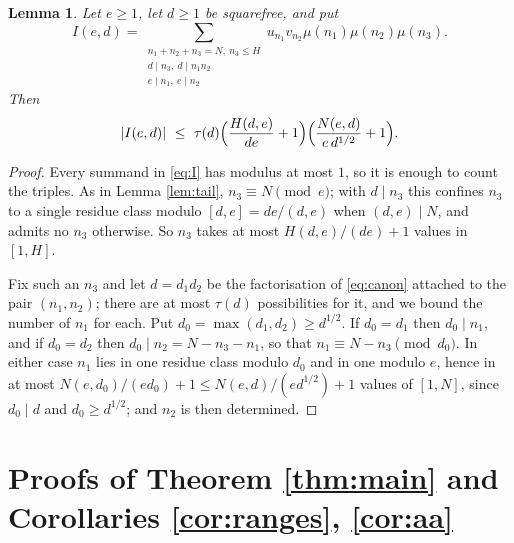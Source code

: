 \documentclass[11pt,a4paper]{article}
\theoremstyle{plain}
\newtheorem{lemma}[theorem]{Lemma}
\theoremstyle{remark}
\newcommand{\lcm}[1]{[#1]}
\begin{document}
\begin{lemma}\label{lem:larged}
Let $e\ge1$, let $d\ge1$ be squarefree, and put
\begin{equation}\label{eq:I}
  I(e,d)=\sum_{\substack{n_1+n_2+n_3=N,\ n_3\le H\\ d\mid n_3,\ d\mid n_1n_2\\ e\mid n_1,\ e\mid n_2}}
  u_{n_1}v_{n_2}\mu(n_1)\mu(n_2)\mu(n_3).
\end{equation}
Then
\[
  |I(e,d)|\ \le\ \tau(d)\Bigl(\frac{H(d,e)}{de}+1\Bigr)\Bigl(\frac{N(e,d)}{e\,d^{1/2}}+1\Bigr).
\]
\end{lemma}

\begin{proof}
Every summand in \eqref{eq:I} has modulus at most $1$, so it is enough to count the triples.
As in Lemma \ref{lem:tail}, $n_3\equiv N\pmod e$; with $d\mid n_3$ this confines $n_3$ to a single
residue class modulo $\lcm{d,e}=de/(d,e)$ when $(d,e)\mid N$, and admits no $n_3$ otherwise. So $n_3$
takes at most $H(d,e)/(de)+1$ values in $[1,H]$.

Fix such an $n_3$ and let $d=d_1d_2$ be the factorisation of \eqref{eq:canon} attached to the pair
$(n_1,n_2)$; there are at most $\tau(d)$ possibilities for it, and we bound the number of $n_1$ for
each. Put $d_0=\max(d_1,d_2)\ge d^{1/2}$. If $d_0=d_1$ then $d_0\mid n_1$, and if $d_0=d_2$ then
$d_0\mid n_2=N-n_3-n_1$, so that $n_1\equiv N-n_3\pmod{d_0}$. In either case $n_1$ lies in one
residue class modulo $d_0$ and in one modulo $e$, hence in at most
$N(e,d_0)/(ed_0)+1\le N(e,d)/(ed^{1/2})+1$ values of $[1,N]$, since $d_0\mid d$ and $d_0\ge d^{1/2}$;
and $n_2$ is then determined.
\end{proof}

\section{Proofs of Theorem \ref{thm:main} and Corollaries \ref{cor:ranges}, \ref{cor:aa}}\label{sec:proof}
\end{document}
